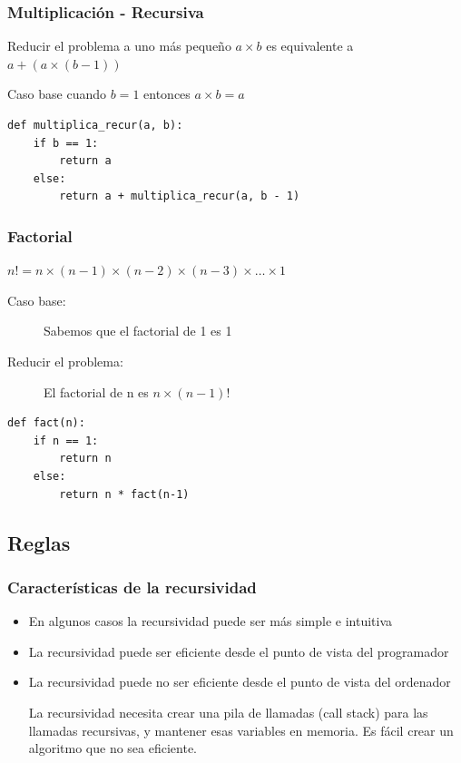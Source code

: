 \documentclass[11pt]{beamer}
\begin{document}
	\begin{frame}[fragile]\frametitle{Multiplicación - Recursiva}
	\begin{block}{Reducir el problema a uno más pequeño}
	\centering $a \times b$ es equivalente a $a + (a  \times (b - 1))$
	\end{block}
	\begin{block}{Caso base}
	\centering cuando $b = 1$ entonces $a \times b = a$
	\end{block}
	\pause
	\begin{lstlisting}
def multiplica_recur(a, b):
	if b == 1:
		return a
	else:
		return a + multiplica_recur(a, b - 1)
\end{lstlisting}
	\end{frame}

	\begin{frame}[fragile]\frametitle{Factorial}
	\begin{block}{}
	\centering $n! = n \times (n - 1) \times (n - 2) \times (n - 3) \times \ldots \times 1$
	\end{block}
	\begin{description}
	\item[Caso base:] Sabemos que el factorial de 1 es 1
	\item[Reducir el problema:] El factorial de n es $n \times (n - 1)!$
	\end{description}
	\pause
	\begin{lstlisting}
def fact(n):
	if n == 1:
		return n
	else:
		return n * fact(n-1)
\end{lstlisting}
	\end{frame}

	\subsection{Reglas}

	\begin{frame}\frametitle{Características de la recursividad}
	\begin{itemize}
	\item En algunos casos la recursividad puede ser más simple e intuitiva
	\item La recursividad puede ser eficiente desde el punto de vista del programador
	\item La recursividad puede no ser eficiente desde el punto de vista del ordenador
	\begin{block}{}
	La recursividad necesita crear una pila de llamadas (call stack) para las llamadas recursivas, y mantener esas variables en memoria. Es fácil crear un algoritmo que no sea eficiente.
	\end{block}
	\end{itemize}
	\end{frame}
\end{document}
